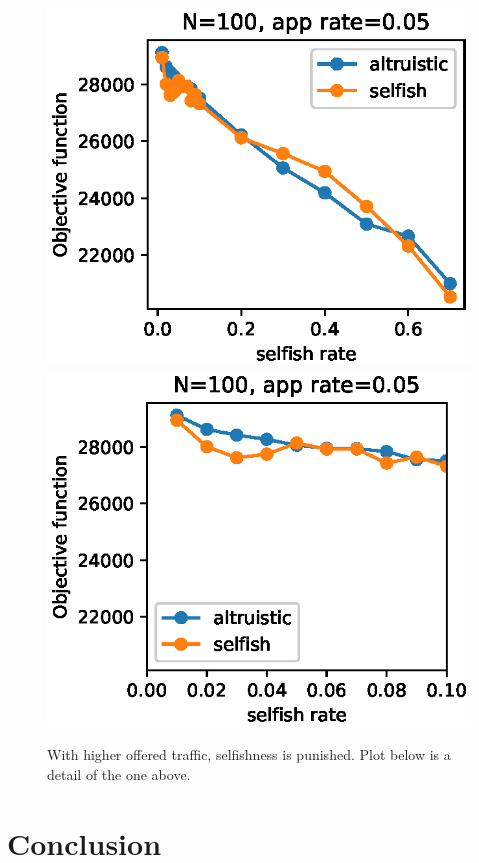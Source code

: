 \documentclass[conference,10.5pt]{IEEEtran}
\begin{document}
\begin{figure}[h]
  \includegraphics{figures/obj_func_vs_selfish_rate_parabola_02.eps}
  \includegraphics{figures/obj_func_vs_selfish_rate_parabola02_zoom.eps}
  \caption{With higher offered traffic, selfishness is punished. Plot below is a detail of the one above.}
\label{fig:par02}
\end{figure}
\clearpage
\section{Conclusion}
\end{document}
